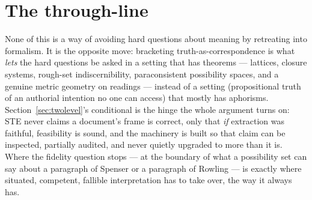 \documentclass[11pt]{article}
\begin{document}
\section{The through-line}
\label{sec:conclusion}

None of this is a way of avoiding hard questions about meaning by
retreating into formalism. It is the opposite move: bracketing
truth-as-correspondence is what \emph{lets} the hard questions be asked
in a setting that has theorems --- lattices, closure systems,
rough-set indiscernibility, paraconsistent possibility spaces, and a
genuine metric geometry on readings --- instead of a setting
(propositional truth of an authorial intention no one can access) that
mostly has aphorisms. Section~\ref{sec:twolevel}'s conditional is the
hinge the whole argument turns on: STE never claims a document's frame
is correct, only that \emph{if} extraction was faithful, feasibility is
sound, and the machinery is built so that claim can be inspected,
partially audited, and never quietly upgraded to more than it is.
Where the fidelity question stops --- at the boundary of what a
possibility set can say about a paragraph of Spenser or a paragraph of
Rowling --- is exactly where situated, competent, fallible
interpretation has to take over, the way it always has.



\end{document}
